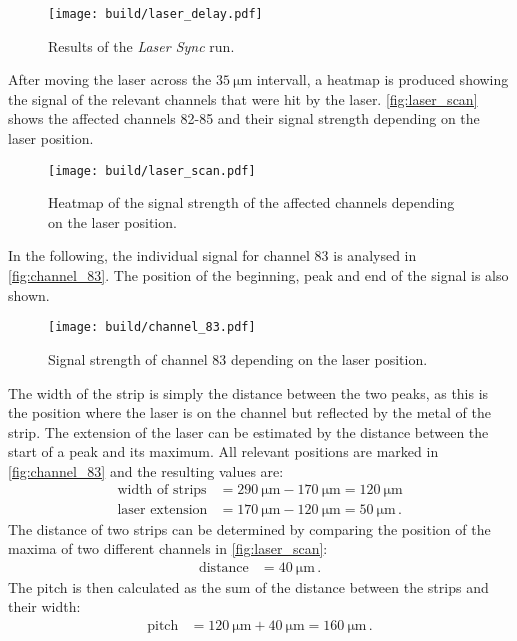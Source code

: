 \begin{figure}[H]
  \centering
  \texttt{[image: build/laser\_delay.pdf]}
  \caption{Results of the \textit{Laser Sync} run.}
  \label{fig:laser_delay}
\end{figure}

After moving the laser across the $\qty{35}{\micro\meter}$ intervall, a heatmap is produced
showing the signal of the relevant channels that were hit by the laser. 
\autoref{fig:laser_scan} shows the affected channels 82-85 and their signal strength depending
on the laser position.

\begin{figure}[H]
  \centering
  \texttt{[image: build/laser\_scan.pdf]}
  \caption{Heatmap of the signal strength of the affected channels depending on the laser position.}
  \label{fig:laser_scan}
\end{figure}

In the following, the individual signal for channel 83 is analysed in \autoref{fig:channel_83}.
The position of the beginning, peak and end of the signal is also shown.

\begin{figure}[H]
  \centering
  \texttt{[image: build/channel\_83.pdf]}
  \caption{Signal strength of channel 83 depending on the laser position.}
  \label{fig:channel_83}
\end{figure}

The width of the strip is simply the distance between the two peaks, as this is the position where the laser
is on the channel but reflected by the metal of the strip. The extension of the laser can be estimated by
the distance between the start of a peak and its maximum. All relevant positions are marked in
\autoref{fig:channel_83} and the resulting values are:
\begin{align*}
  \text{width of strips} &= \qty{290}{\micro\meter} - \qty{170}{\micro\meter} = \qty{120}{\micro\meter} \\
  \text{laser extension} &= \qty{170}{\micro\meter} - \qty{120}{\micro\meter} = \qty{50}{\micro\meter} \, .
\end{align*}
The distance of two strips can be determined by comparing the position of the maxima of two different channels
in \autoref{fig:laser_scan}:
\begin{align*}
  \text{distance} &= \qty{40}{\micro\meter} \, .
\end{align*}
The pitch is then calculated as the sum of the distance between the strips and their width:
\begin{align*}
  \text{pitch} &= \qty{120}{\micro\meter} + \qty{40}{\micro\meter} = \qty{160}{\micro\meter} \, .
\end{align*}

